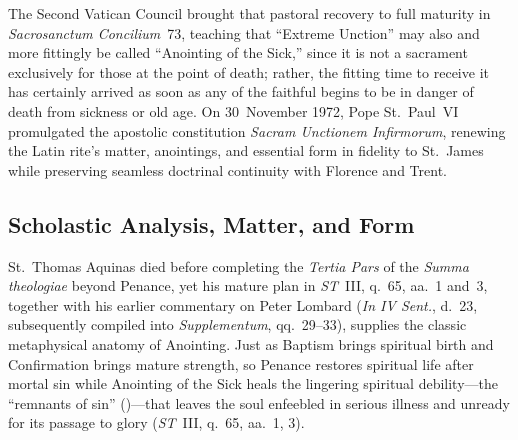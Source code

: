 The Second Vatican Council brought that pastoral recovery to full maturity in \emph{Sacrosanctum Concilium}~73, teaching that ``Extreme Unction'' may also and more fittingly be called ``Anointing of the Sick,'' since it is not a sacrament exclusively for those at the point of death; rather, the fitting time to receive it has certainly arrived as soon as any of the faithful begins to be in danger of death from sickness or old age. On 30~November 1972, Pope St.~Paul~VI promulgated the apostolic constitution \emph{Sacram Unctionem Infirmorum}, renewing the Latin rite's matter, anointings, and essential form in fidelity to St.~James while preserving seamless doctrinal continuity with Florence and Trent.

\subsection{Scholastic Analysis, Matter, and Form}
\label{subsec:anointing-matter-form}

St.~Thomas Aquinas died before completing the \emph{Tertia Pars} of the \emph{Summa theologiae} beyond Penance, yet his mature plan in \emph{ST}~III, q.~65, aa.~1 and~3, together with his earlier commentary on Peter Lombard (\emph{In IV Sent.}, d.~23, subsequently compiled into \emph{Supplementum}, qq.~29--33), supplies the classic metaphysical anatomy of Anointing. Just as Baptism brings spiritual birth and Confirmation brings mature strength, so Penance restores spiritual life after mortal sin while Anointing of the Sick heals the lingering spiritual debility---the ``remnants of sin'' ()---that leaves the soul enfeebled in serious illness and unready for its passage to glory (\emph{ST}~III, q.~65, aa.~1, 3).


